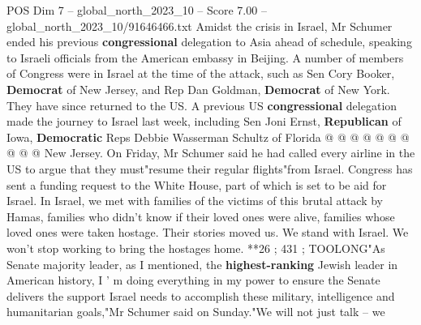 \begin{textsample}{POS Dim 7 – global\_north\_2023\_10 – Score 7.00 – global\_north\_2023\_10/91646466.txt}
Amidst the crisis in Israel, Mr Schumer ended his previous \textbf{congressional} delegation to Asia ahead of schedule, speaking to Israeli officials from the American embassy in Beijing.
A number of members of Congress were in Israel at the time of the attack, such as Sen Cory Booker, \textbf{Democrat} of New Jersey, and Rep Dan Goldman, \textbf{Democrat} of New York.
They have since returned to the US.
A previous US \textbf{congressional} delegation made the journey to Israel last week, including Sen Joni Ernst, \textbf{Republican} of Iowa, \textbf{Democratic} Reps Debbie Wasserman Schultz of Florida @ @ @ @ @ @ @ @ @ @ New Jersey.
On Friday, Mr Schumer said he had called every airline in the US to argue that they must"resume their regular flights"from Israel.
Congress has sent a funding request to the White House, part of which is set to be aid for Israel.
In Israel, we met with families of the victims of this brutal attack by Hamas, families who didn't know if their loved ones were alive, families whose loved ones were taken hostage.
Their stories moved us.
We stand with Israel.
We won't stop working to bring the hostages home. **26 ; 431 ; TOOLONG"As Senate majority leader, as I mentioned, the \textbf{highest-ranking} Jewish leader in American history, I ' m doing everything in my power to ensure the Senate delivers the support Israel needs to accomplish these military, intelligence and humanitarian goals,"Mr Schumer said on Sunday."We will not just talk -- we

\end{textsample}
